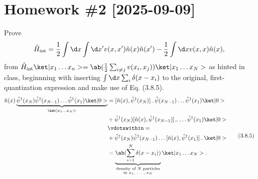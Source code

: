 
\section*{Homework \#2 [2025-09-09]}

\begin{problem}
  Prove
  \[
    \hat H_\text{int} = \frac12 \int \d x \int \d x' v(x,x')
                        \hat n(x) \hat n(x')
                      - \frac12 \int \d x v(x,x) \hat n(x),
  \]
  from $\hat H_\text{int} \ket|x_1 \ldots x_n>
  = \ab(\frac12 \sum_{i\neq j} v(x_i,x_j)) \ket|x_1 \ldots x_N>$
  as hinted in class, beginnning with inserting\linebreak
  $\int \d x \sum_i \delta(x - x_i)$ to the original,
  first-quantization expression and make use of Eq. (3.8.5).
  \begin{equation}
    \begin{aligned}
      \hat n(x) \underbrace{
        \hat\psi^\dagger(x_N) \hat\psi^\dagger(x_{N-1}) \ldots
        \hat\psi^\dagger(x_1) \ket|0>}_{\ket|x_1\ldots x_N>}
  & = [\hat n(x), \hat\psi^\dagger(x_N)]_-
      \hat\psi(x_{N-1}) \ldots \hat\psi^\dagger(x_1) \ket|0>\\
  & + \hat\psi^\dagger(x_N) [\hat n(x), \hat\psi^\dagger(x_{N-1})]_- \ldots
      \hat\psi^\dagger(x_1) \ket|0>\\
  & \vdotswithin =\\
  & + \hat\psi^\dagger(x_N) \hat\psi^\dagger(x_{N-1}) \ldots
      [\hat n(x), \hat\psi^\dagger(x_1)]_- \ket|0>\\
  & = \underbrace{\ab(\sum_{i=1}^N \delta(x - x_i))}_
      {\substack{\text{density of $N$ particles}\\
                 \text{in $x_1$, \ldots\,,~$x_N$}}}
      \ket|x_1 \ldots x_N>.
    \end{aligned}
    \tag{3.8.5}\label{3.8.5}
  \end{equation}
\end{problem}
